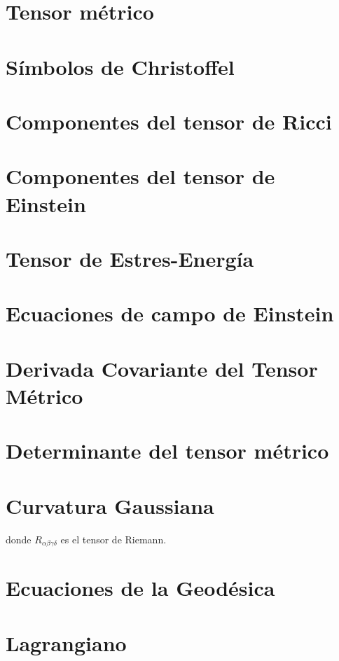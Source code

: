 \documentclass{article}%
\begin{document}
%



\section*{Tensor métrico}


\section*{Símbolos de Christoffel}


\section*{Componentes del tensor de Ricci}


\section*{Componentes del tensor de Einstein}


\section*{Tensor de Estres-Energía}


\section*{Ecuaciones de campo de Einstein}


\section*{Derivada Covariante del Tensor Métrico}





\section*{Determinante del tensor métrico}


\section*{Curvatura Gaussiana}


donde $R_{\alpha\beta\gamma\delta}$ es el tensor de Riemann.


\section*{Ecuaciones de la Geodésica}





\section*{Lagrangiano}

\end{document}
